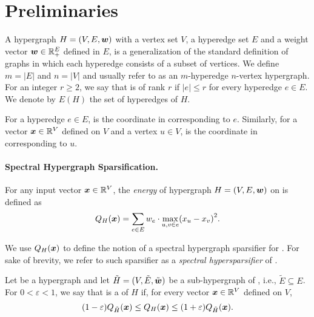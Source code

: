 \section{Preliminaries}

A hypergraph \( { H} = (V, E, \boldsymbol{w}) \) with a vertex set \( V \), a hyperedge set \( E \) and a weight vector \( \boldsymbol{w} \in \mathbb R _+ ^{E} \) defined in \( E \), is a generalization of the standard definition of graphs in which each hyperedge consists of a subset of vertices.
We define \( m = |E| \) and \( n = |V| \) and usually refer to  as an \( m \)-hyperedge \( n \)-vertex hypergraph.
For an integer \( r \geq 2 \), we say that  is of rank \( r \) if \( |e| \leq r \) for every hyperedge \( e \in E \).
We denote by \( E(H) \) the set of hyperedges of \( H \).

For a hyperedge \( e \in E \),  is the coordinate in  corresponding to \( e \).
Similarly, for a vector \( \boldsymbol{x} \in \mathbb R ^{V} \) defined on \( V \) and a vertex \( u \in V \),  is the coordinate in  corresponding to \( u \).

\paragraph{Spectral Hypergraph Sparsification.}
For any input vector \( \boldsymbol{x} \in \mathbb R ^{V} \), the \textit{energy} of hypergraph \( { H} = (V, E, \boldsymbol{w}) \) on  is defined as
\begin{equation*}
Q _\hypergraph{H} (\vect{x}) = \sum_{e \in E} \w{e} \cdot \max_{u, v \in e} \left( \x{u} - \x{v} \right)^2.
\end{equation*}

We use \( Q _{ H} (\boldsymbol{x}) \) to define the notion of a spectral hypergraph sparsifier for .
For sake of brevity, we refer to such sparsifier as a \textit{spectral hypersparsifier} of .
\begin{definition}
Let  be a hypergraph and let \( { \tilde H} = (V, \tilde{E} , \tilde{\boldsymbol{w}}) \) be a sub-hypergraph of , i.e., \( \tilde{E} \subseteq E \).
For \( 0 < \varepsilon < 1 \), we say that  is a 
\SpectralHypersparsifier{} of \( H \) if, for every vector \( \boldsymbol{x} \in \mathbb R ^{V} \) defined on \( V \),
\begin{equation} \label{eq:spectral_hypergraph}
(1 - \varepsilon) Q _{ \tilde H} (\boldsymbol{x}) \leq Q _{ H} (\boldsymbol{x}) \leq (1 + \varepsilon) Q _{ \tilde H} (\boldsymbol{x}).
\end{equation}
\end{definition}

